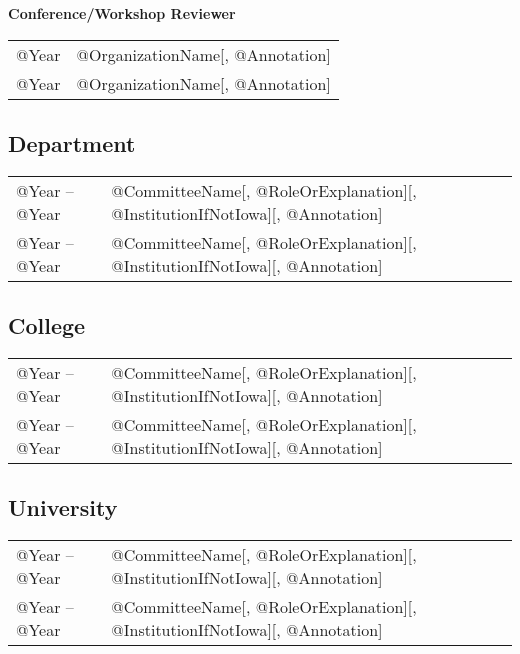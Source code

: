 \documentclass[10pt]{article}
\begin{document}
\begin{itemize}
\begin{IOWA ONLY}
\item[] \textbf{Conference/Workshop Reviewer}
\\[1.3ex]
\begin{tabular}{l@{\quad\ }p{34em}} 
 @Year & @OrganizationName[, @Annotation]
 \\[.5ex]
 @Year & @OrganizationName[, @Annotation]
\end{tabular}
\end{IOWA ONLY}

\end{itemize}



\begin{IOWA ONLY}
\subsection*{Department}

\begin{tabular}{l@{\quad\ }p{34em}} 
 @Year -- @Year 
 & @CommitteeName[, @RoleOrExplanation][, @InstitutionIfNotIowa][, @Annotation]
 \\[.5ex]
 @Year -- @Year 
 & @CommitteeName[, @RoleOrExplanation][, @InstitutionIfNotIowa][, @Annotation]
\end{tabular}

\subsection*{College}

\begin{tabular}{l@{\quad\ }p{34em}} 
 @Year -- @Year 
 & @CommitteeName[, @RoleOrExplanation][, @InstitutionIfNotIowa][, @Annotation]
 \\[.5ex]
 @Year -- @Year 
 & @CommitteeName[, @RoleOrExplanation][, @InstitutionIfNotIowa][, @Annotation]
\end{tabular}

\subsection*{University}

\begin{tabular}{l@{\quad\ }p{34em}} 
 @Year -- @Year 
 & @CommitteeName[, @RoleOrExplanation][, @InstitutionIfNotIowa][, @Annotation]
 \\[.5ex]
 @Year -- @Year 
 & @CommitteeName[, @RoleOrExplanation][, @InstitutionIfNotIowa][, @Annotation]
\end{tabular}


\end{IOWA ONLY}
\end{document}
